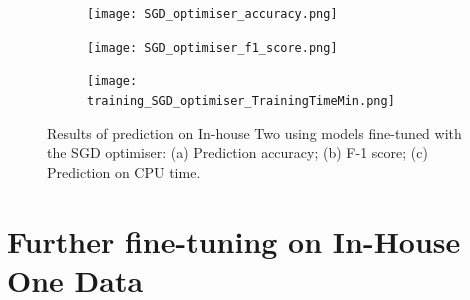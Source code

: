 \documentclass[a4paper,12pt]{article}
\newcommand{\figwidthh}{0.48\textwidth}
\begin{document}
\begin{figure}[p] 
	\begin{center}
		\begin{subfigure}[b]{\figwidthh}
			\caption{} 
			\texttt{[image: SGD\_optimiser\_accuracy.png]}
		\end{subfigure}
        \hfill
		\begin{subfigure}[b]{\figwidthh}
			\caption{}
			\texttt{[image: SGD\_optimiser\_f1\_score.png]}
		\end{subfigure}
        \hfill
		\begin{subfigure}[b]{\figwidthh}
			\caption{}
			\texttt{[image: training\_SGD\_optimiser\_TrainingTimeMin.png]}
		\end{subfigure}
	\end{center}
	\caption{Results of prediction on In-house Two using models fine-tuned with the SGD optimiser: (a) Prediction accuracy; (b) F-1 score; (c) Prediction on CPU time.
	} 
	\label{fig:res_predict_SGD}
\end{figure}

\newpage



\section{Further fine-tuning on In-House One Data}
\end{document}
